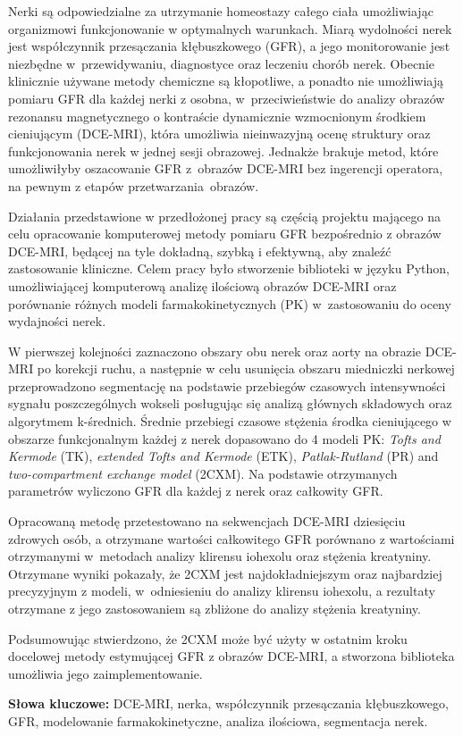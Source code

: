 	
	\begin{spacing}{1.0}
	\begin{small}

Nerki są odpowiedzialne za utrzymanie homeostazy całego ciała umożliwiając organizmowi funkcjonowanie w optymalnych warunkach. Miarą wydolności nerek jest współczynnik przesączania kłębuszkowego (GFR), a jego monitorowanie jest niezbędne w~przewidywaniu, diagnostyce oraz leczeniu chorób nerek. Obecnie klinicznie używane metody chemiczne są kłopotliwe, a ponadto nie umożliwiają pomiaru GFR dla każdej nerki z osobna, w~przeciwieństwie do analizy obrazów rezonansu magnetycznego o kontraście dynamicznie wzmocnionym środkiem cieniującym (DCE-MRI), która umożliwia nieinwazyjną ocenę struktury oraz funkcjonowania  nerek w jednej sesji obrazowej. Jednakże brakuje metod, które umożliwiłyby oszacowanie GFR z~obrazów DCE-MRI bez ingerencji operatora, na pewnym z etapów przetwarzania~obrazów.

Działania przedstawione w przedłożonej pracy są częścią projektu mającego na celu opracowanie komputerowej metody pomiaru GFR bezpośrednio z obrazów DCE-MRI, będącej na tyle dokładną, szybką i efektywną, aby znaleźć zastosowanie kliniczne. Celem pracy było stworzenie biblioteki w języku Python, umożliwiającej komputerową analizę ilościową obrazów DCE-MRI oraz porównanie różnych modeli farmakokinetycznych (PK) w~zastosowaniu do oceny wydajności nerek.

W pierwszej kolejności zaznaczono obszary obu nerek oraz aorty na obrazie DCE-MRI po korekcji ruchu, a następnie w celu usunięcia obszaru miedniczki nerkowej przeprowadzono segmentację na podstawie przebiegów czasowych intensywności sygnału poszczególnych wokseli posługując się analizą głównych składowych oraz algorytmem k-średnich. Średnie przebiegi czasowe stężenia środka cieniującego w obszarze funkcjonalnym każdej z nerek dopasowano do 4 modeli PK: \textit{Tofts and Kermode} (TK), \textit{extended Tofts and Kermode} (ETK), \textit{Patlak-Rutland} (PR) and \textit{two-compartment exchange model} (2CXM). Na podstawie otrzymanych parametrów wyliczono GFR dla każdej z nerek oraz całkowity GFR.

Opracowaną metodę przetestowano na sekwencjach DCE-MRI dziesięciu zdro\-wych osób, a otrzymane wartości całkowitego GFR porównano z wartościami otrzymanymi w~metodach analizy klirensu iohexolu oraz stężenia kreatyniny. 
Otrzymane wyniki pokazały, że 2CXM jest najdokładniejszym oraz najbardziej precyzyjnym z modeli, w~odniesieniu do analizy klirensu iohexolu, a rezultaty otrzymane z jego zastosowaniem są zbliżone do analizy stężenia kreatyniny.

Podsumowując stwierdzono, że 2CXM może być użyty w ostatnim kroku docelowej metody estymującej GFR z obrazów DCE-MRI, a stworzona biblioteka umożliwia jego zaimplementowanie. 
 

	\end{small}
	
	\vfill
		\normalsize \noindent \textbf{Słowa kluczowe:} DCE-MRI, nerka, współczynnik przesączania kłębuszkowego, GFR, modelowanie farmakokinetyczne, analiza ilościowa, segmentacja nerek.  
		
			\end{spacing}
		\newpage
		\restoregeometry
\thispagestyle{empty}
\mbox{}

	\newpage	
